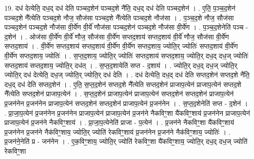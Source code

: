 \documentclass[17pt]{extarticle}
\begin{document}
19. दध॑ देत्येति॒ दध॒द् दध॑ देति पञ्चद॒शेन॑ पञ्चद॒शे नै॑ति॒ दध॒द् दध॑ देति पञ्चद॒शेन॑ । . ए॒ति॒ प॒ञ्च॒द॒शेन॑ पञ्चद॒शे नै᳚त्येति पञ्चद॒शे नौज॒ सौज॑सा पञ्चद॒शे नै᳚त्येति पञ्चद॒शे नौज॑सा । . प॒ञ्च॒द॒शे नौज॒ सौज॑सा पञ्चद॒शेन॑ पञ्चद॒शे नौज॑सा वी॒र्ये॑ण वी॒र्ये॑ णौज॑सा पञ्चद॒शेन॑ पञ्चद॒शे नौज॑सा वी॒र्ये॑ण । . प॒ञ्च॒द॒शेनेति॑ पञ्च - द॒शेन॑ । . ओज॑सा वी॒र्ये॑ण वी॒र्ये॑ णौज॒ सौज॑सा वी॒र्ये॑ण सप्तद॒शाय॑ सप्तद॒शाय॑ वी॒र्ये॑ णौज॒ सौज॑सा वी॒र्ये॑ण सप्तद॒शाय॑ । . वी॒र्ये॑ण सप्तद॒शाय॑ सप्तद॒शाय॑ वी॒र्ये॑ण वी॒र्ये॑ण सप्तद॒शाय॒ ज्योति॒र् ज्योतिः॑ सप्तद॒शाय॑ वी॒र्ये॑ण वी॒र्ये॑ण सप्तद॒शाय॒ ज्योतिः॑ । . स॒प्त॒द॒शाय॒ ज्योति॒र् ज्योतिः॑ सप्तद॒शाय॑ सप्तद॒शाय॒ ज्योति॒र् दध॒द् दध॒ज् ज्योतिः॑ सप्तद॒शाय॑ सप्तद॒शाय॒ ज्योति॒र् दध॑त् । . स॒प्त॒द॒शायेति॑ सप्त - द॒शाय॑ । . ज्योति॒र् दध॒द् दध॒ज् ज्योति॒र् ज्योति॒र् दध॑ देत्येति॒ दध॒ज् ज्योति॒र् ज्योति॒र् दध॑ देति । . दध॑ देत्येति॒ दध॒द् दध॑ देति सप्तद॒शेन॑ सप्तद॒शे नै॑ति॒ दध॒द् दध॑ देति सप्तद॒शेन॑ । . ए॒ति॒ स॒प्त॒द॒शेन॑ सप्तद॒शे नै᳚त्येति सप्तद॒शेन॑ प्राजाप॒त्येन॑ प्राजाप॒त्येन॑ सप्तद॒शे नै᳚त्येति सप्तद॒शेन॑ प्राजाप॒त्येन॑ । . स॒प्त॒द॒शेन॑ प्राजाप॒त्येन॑ प्राजाप॒त्येन॑ सप्तद॒शेन॑ सप्तद॒शेन॑ प्राजाप॒त्येन॑ प्र॒जन॑नेन प्र॒जन॑नेन प्राजाप॒त्येन॑ सप्तद॒शेन॑ सप्तद॒शेन॑ प्राजाप॒त्येन॑ प्र॒जन॑नेन । . स॒प्त॒द॒शेनेति॑ सप्त - द॒शेन॑ । . प्रा॒जा॒प॒त्येन॑ प्र॒जन॑नेन प्र॒जन॑नेन प्राजाप॒त्येन॑ प्राजाप॒त्येन॑ प्र॒जन॑ने नैकविꣳ॒॒शा यै॑कविꣳ॒॒शाय॑ प्र॒जन॑नेन प्राजाप॒त्येन॑ प्राजाप॒त्येन॑ प्र॒जन॑ने नैकविꣳ॒॒शाय॑ । . प्रा॒जा॒प॒त्येनेति॑ प्राजा - प॒त्येन॑ । . प्र॒जन॑ने नैकविꣳ॒॒शा यै॑कविꣳ॒॒शाय॑ प्र॒जन॑नेन प्र॒जन॑ने नैक॑विꣳ॒॒शाय॒ ज्योति॒र् ज्योति॑ रेकविꣳ॒॒शाय॑ प्र॒जन॑नेन प्र॒जन॑ने नैक॑विꣳ॒॒शाय॒ ज्योतिः॑ । . प्र॒जन॑ने॒नेति॑ प्र - जन॑नेन । . ए॒क॒विꣳ॒॒शाय॒ ज्योति॒र् ज्योति॑ रेकविꣳ॒॒शा यै॑कविꣳ॒॒शाय॒ ज्योति॒र् दध॒द् दध॒ज् ज्योति॑ रेकविꣳ॒॒शा
\end{document}
